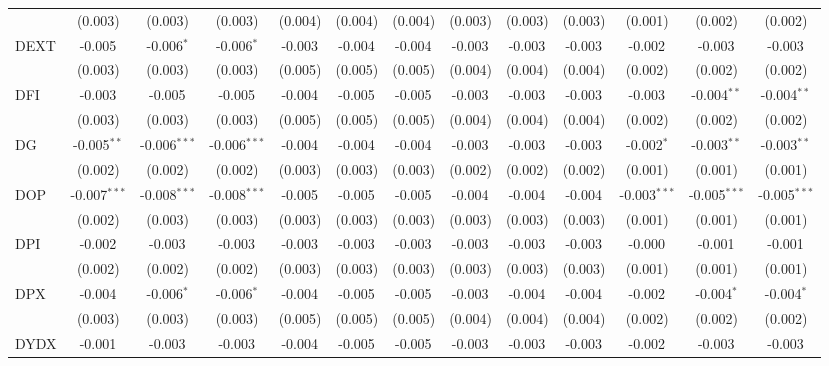 \begin{table}[!htbp]
\begin{tabular}{@{\extracolsep{5pt}}lcccccccccccc}
  & (0.003) & (0.003) & (0.003) & (0.004) & (0.004) & (0.004) & (0.003) & (0.003) & (0.003) & (0.001) & (0.002) & (0.002) \\
 DEXT & -0.005$^{}$ & -0.006$^{*}$ & -0.006$^{*}$ & -0.003$^{}$ & -0.004$^{}$ & -0.004$^{}$ & -0.003$^{}$ & -0.003$^{}$ & -0.003$^{}$ & -0.002$^{}$ & -0.003$^{}$ & -0.003$^{}$ \\
  & (0.003) & (0.003) & (0.003) & (0.005) & (0.005) & (0.005) & (0.004) & (0.004) & (0.004) & (0.002) & (0.002) & (0.002) \\
 DFI & -0.003$^{}$ & -0.005$^{}$ & -0.005$^{}$ & -0.004$^{}$ & -0.005$^{}$ & -0.005$^{}$ & -0.003$^{}$ & -0.003$^{}$ & -0.003$^{}$ & -0.003$^{}$ & -0.004$^{**}$ & -0.004$^{**}$ \\
  & (0.003) & (0.003) & (0.003) & (0.005) & (0.005) & (0.005) & (0.004) & (0.004) & (0.004) & (0.002) & (0.002) & (0.002) \\
 DG & -0.005$^{**}$ & -0.006$^{***}$ & -0.006$^{***}$ & -0.004$^{}$ & -0.004$^{}$ & -0.004$^{}$ & -0.003$^{}$ & -0.003$^{}$ & -0.003$^{}$ & -0.002$^{*}$ & -0.003$^{**}$ & -0.003$^{**}$ \\
  & (0.002) & (0.002) & (0.002) & (0.003) & (0.003) & (0.003) & (0.002) & (0.002) & (0.002) & (0.001) & (0.001) & (0.001) \\
 DOP & -0.007$^{***}$ & -0.008$^{***}$ & -0.008$^{***}$ & -0.005$^{}$ & -0.005$^{}$ & -0.005$^{}$ & -0.004$^{}$ & -0.004$^{}$ & -0.004$^{}$ & -0.003$^{***}$ & -0.005$^{***}$ & -0.005$^{***}$ \\
  & (0.002) & (0.003) & (0.003) & (0.003) & (0.003) & (0.003) & (0.003) & (0.003) & (0.003) & (0.001) & (0.001) & (0.001) \\
 DPI & -0.002$^{}$ & -0.003$^{}$ & -0.003$^{}$ & -0.003$^{}$ & -0.003$^{}$ & -0.003$^{}$ & -0.003$^{}$ & -0.003$^{}$ & -0.003$^{}$ & -0.000$^{}$ & -0.001$^{}$ & -0.001$^{}$ \\
  & (0.002) & (0.002) & (0.002) & (0.003) & (0.003) & (0.003) & (0.003) & (0.003) & (0.003) & (0.001) & (0.001) & (0.001) \\
 DPX & -0.004$^{}$ & -0.006$^{*}$ & -0.006$^{*}$ & -0.004$^{}$ & -0.005$^{}$ & -0.005$^{}$ & -0.003$^{}$ & -0.004$^{}$ & -0.004$^{}$ & -0.002$^{}$ & -0.004$^{*}$ & -0.004$^{*}$ \\
  & (0.003) & (0.003) & (0.003) & (0.005) & (0.005) & (0.005) & (0.004) & (0.004) & (0.004) & (0.002) & (0.002) & (0.002) \\
 DYDX & -0.001$^{}$ & -0.003$^{}$ & -0.003$^{}$ & -0.004$^{}$ & -0.005$^{}$ & -0.005$^{}$ & -0.003$^{}$ & -0.003$^{}$ & -0.003$^{}$ & -0.002$^{}$ & -0.003$^{}$ & -0.003$^{}$ \\

\end{tabular}
\end{table}
